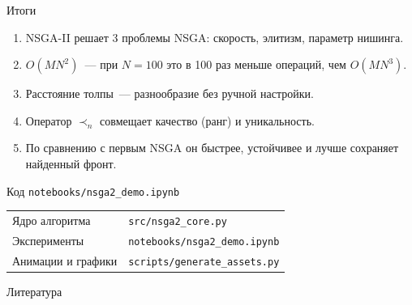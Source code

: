 \documentclass[aspectratio=169,11pt]{beamer}
\begin{document}
\begin{frame}{Итоги}
  \large
  \begin{enumerate}
    \item NSGA-II решает 3 проблемы NSGA: скорость, элитизм, параметр нишинга.
    \vspace{0.2cm}
    \item $O(MN^2)$~--- при $N=100$ это в 100 раз меньше операций, чем $O(MN^3)$.
    \vspace{0.2cm}
    \item Расстояние толпы~--- разнообразие без ручной настройки.
    \vspace{0.2cm}
    \item Оператор $\prec_n$ совмещает качество (ранг) и уникальность.
    \vspace{0.2cm}
    \item По сравнению с первым NSGA он быстрее, устойчивее и лучше сохраняет найденный фронт.
  \end{enumerate}
\end{frame}

\begin{frame}{Код}
  \centering
  \Large
  \texttt{notebooks/nsga2\_demo.ipynb}
  \vspace{0.6cm}
  \normalsize
  \begin{tabular}{ll}
    Ядро алгоритма   & \texttt{src/nsga2\_core.py} \\
    Эксперименты     & \texttt{notebooks/nsga2\_demo.ipynb} \\
    Анимации и графики & \texttt{scripts/generate\_assets.py} \\
  \end{tabular}
\end{frame}

\begin{frame}[allowframebreaks]{Литература}
  \tiny
  \printbibliography
\end{frame}
\end{document}

